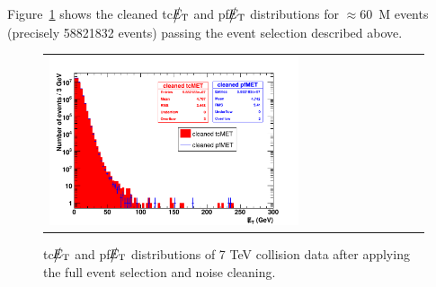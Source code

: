 Figure~\ref{fig:calomet} shows the cleaned tc$\big\slash\hspace{-1.6ex}{E_\text{T}}$ and pf$\big\slash\hspace{-1.6ex}{E_\text{T}}$ distributions for $\approx 60$~M events 
(precisely 58821832 events) passing the event selection described above.
\begin{figure}[h]
 \centering
 \begin{tabular}{ll}
   \includegraphics[width=0.7\textwidth]{fig/met.pdf} 
 \end{tabular}
\caption{tc$\big\slash\hspace{-1.6ex}{E_\text{T}}$ and pf$\big\slash\hspace{-1.6ex}{E_\text{T}}$ distributions of 7 TeV collision data after applying the full event selection and noise cleaning.}
\label{fig:calomet}
\end{figure}
